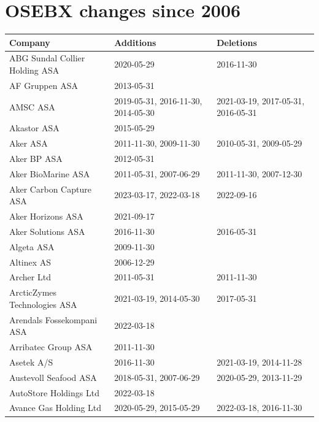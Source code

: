 \begin{appendices}
\begin{table}[H]
\vspace{1em}
\caption{OSEBX constituents at the start of 2006}
\label{osebx-constituents-start-of-2006}
\end{table}


\section{OSEBX changes since 2006}
\begin{table}[H]
\centering
\scriptsize
\begin{tabular}{lll}
  \hline
Company & Additions & Deletions \\  
\hline
ABG Sundal Collier Holding ASA & 2020-05-29 & 2016-11-30 \\
AF Gruppen ASA & 2013-05-31 & \\
AMSC ASA & 2019-05-31, 2016-11-30, 2014-05-30 & 2021-03-19, 2017-05-31, 2016-05-31 \\
Akastor ASA & 2015-05-29 & \\
Aker ASA & 2011-11-30, 2009-11-30 & 2010-05-31, 2009-05-29 \\
Aker BP ASA & 2012-05-31 & \\
Aker BioMarine ASA & 2011-05-31, 2007-06-29 & 2011-11-30, 2007-12-30 \\
Aker Carbon Capture ASA & 2023-03-17, 2022-03-18 & 2022-09-16 \\
Aker Horizons ASA & 2021-09-17 & \\
Aker Solutions ASA & 2016-11-30 & 2016-05-31 \\
Algeta ASA & 2009-11-30 & \\
Altinex AS & 2006-12-29 & \\
Archer Ltd & 2011-05-31 & 2011-11-30 \\
ArcticZymes Technologies ASA & 2021-03-19, 2014-05-30 & 2017-05-31 \\
Arendals Fossekompani ASA & 2022-03-18 & \\
Arribatec Group ASA & 2011-11-30 & \\
Asetek A/S & 2016-11-30 & 2021-03-19, 2014-11-28 \\
Austevoll Seafood ASA & 2018-05-31, 2007-06-29 & 2020-05-29, 2013-11-29 \\
AutoStore Holdings Ltd & 2022-03-18 & \\
Avance Gas Holding Ltd & 2020-05-29, 2015-05-29 & 2022-03-18, 2016-11-30 \\

\end{tabular}
\end{table}
\end{appendices}
